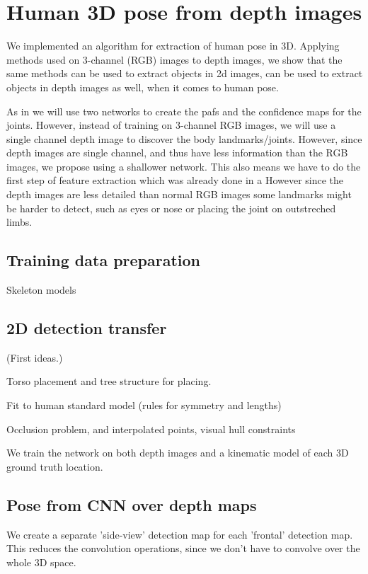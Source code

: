 \chapter{Human 3D pose from depth images}
We implemented an algorithm for extraction of human pose in 3D.
Applying methods used on 3-channel (RGB) images to depth images, we show that the same methods can be used to extract objects in 2d images, can be used to extract objects in depth images as well, when it comes to human pose.

As in \cite{cao2017realtime} we will use two networks to create the \gls{paf}s and the confidence maps for the joints. However, instead of training on 3-channel RGB images, we will use a single channel depth image to discover the body landmarks/joints.
However, since depth images are single channel, and thus have less information than the RGB images, we propose using a shallower network. This also means we have to do the first step of feature extraction which was already done in a
However since the depth images are less detailed than normal RGB images some landmarks might be harder to detect, such as eyes or nose or placing the joint on outstreched limbs.


\section{Training data preparation}


Skeleton models


\section{2D detection transfer}

(First ideas.)

Torso placement and tree structure for placing.

Fit to human standard model (rules for symmetry and lengths)

Occlusion problem, and interpolated points, visual hull constraints

We train the network on both depth images and a kinematic model of each 3D ground truth location.

\section{Pose from CNN over depth maps}

We create a separate 'side-view' detection map for each 'frontal' detection map. This reduces the convolution operations, since we don't have to convolve over the whole 3D space.
